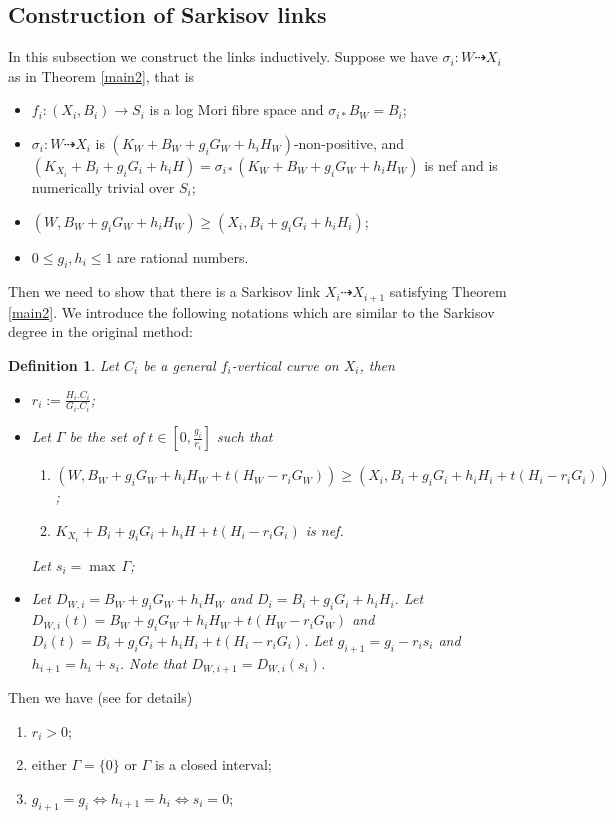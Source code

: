\documentclass[11pt]{amsart}
\newtheorem{defn}{Definition}[section]
\begin{document}
\subsection{Construction of Sarkisov links}
In this subsection we construct the links inductively. Suppose we have $\sigma_{i}:W\dashrightarrow X_{i}$ as in Theorem  \ref{main2}, that is 
\begin{itemize}
  \item $f_{i}:(X_{i},B_{i})\to S_{i}$ is a log Mori fibre space and $\sigma_{i*} B_{W}=B_{i}$;
  \item $\sigma_{i}:W\dashrightarrow  X_{i}$ is $(K_{W}+B_{W}+g_{i}G_{W}+h_{i}H_{W})$-non-positive, and $(K_{X_{i}}+B_{i}+g_{i}G_{i}+h_{i}H)=\sigma_{i*}(K_{W}+B_{W}+g_{i}G_{W}+h_{i}H_{W})$ is nef and is numerically trivial over $S_{i}$;
  \item $(W,B_{W}+g_{i}G_{W}+h_{i}H_{W})\geqslant (X_{i},B_{i}+g_{i}G_{i}+h_{i}H_{i})$;
  \item $0\leqslant g_{i},h_{i}\leqslant 1$ are  rational numbers.
\end{itemize}
Then we need to show that there is a Sarkisov link $X_{i}\dashrightarrow X_{i+1}$ satisfying  Theorem \ref{main2}. We introduce the following notations which are similar to the Sarkisov degree in the original method:
\begin{defn}
  Let $C_{i}$ be a general $f_{i}$-vertical curve on $X_{i}$, then
  \begin{itemize}
    \item $r_{i}:=\frac{H_{i}.C_{i}}{G_{i}.C_{i}}$;
    \item Let $\Gamma$ be the set of $t\in [0,\frac{g_{i}}{r_{i}}] $ such that 
      \begin{enumerate}
        \item\label{singularcondition} $\left(W,B_{W}+g_{i}G_{W}+h_{i}H_{W}+t(H_{W}-r_{i}G_{W})\right)\geqslant \left(X_{i},B_{i}+g_{i}G_{i}+h_{i}H_{i}+t\left(H_{i}-r_{i}G_{i}\right)\right)$;
        \item$K_{X_{i}}+B_{i}+g_{i}G_i+h_{i}H+t(H_{i}-r_{i}G_{i})$ is nef.
    \end{enumerate}
    Let $s_{i}=\max\, \Gamma $;
\item Let $D_{W,i}=B_{W}+g_{i}G_{W}+h_{i}H_{W}$ and $D_{i}=B_{i}+g_{i}G_{i}+h_{i}H_{i}$. Let $D_{W,i}(t)=B_{W}+g_{i}G_{W}+h_{i}H_{W}+t(H_{W}-r_{i}G_{W})$ and $D_{i}(t)=B_{i}+g_{i}G_{i}+h_{i}H_{i}+t (H_{i}-r_{i}G_{i})$. Let $g_{i+1}=g_{i}-r_{i}s_{i}$ and $h_{i+1}=h_{i}+s_{i}$. Note that $D_{W,i+1}=D_{W,i}(s_{i})$. 
  \end{itemize}
\end{defn}
Then we have (see \cite[Lemma 4.4]{liuSarkisovProgramGeneralized2021} for details)
\begin{enumerate}
    \item $r_{i}>0$;
    \item either $\Gamma=\{0\} $ or $\Gamma$ is a closed interval;
    \item $g_{i+1}=g_{i} \Leftrightarrow h_{i+1}=h_{i} \Leftrightarrow s_{i}=0$;
\end{enumerate}
\end{document}
